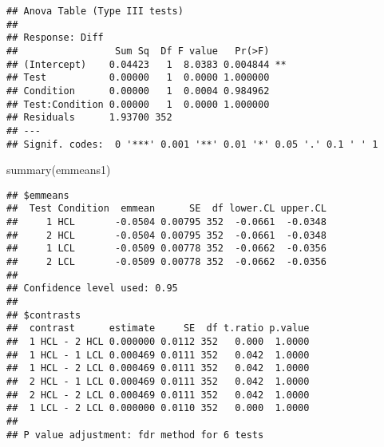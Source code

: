 \documentclass[
]{article}
\newenvironment{Shaded}{\begin{snugshade}}{\end{snugshade}}
\newcommand{\AttributeTok}[1]{\textcolor[rgb]{0.77,0.63,0.00}{#1}}
\newcommand{\CommentTok}[1]{\textcolor[rgb]{0.56,0.35,0.01}{\textit{#1}}}
\newcommand{\FunctionTok}[1]{\textcolor[rgb]{0.00,0.00,0.00}{#1}}
\newcommand{\NormalTok}[1]{#1}
\newcommand{\OtherTok}[1]{\textcolor[rgb]{0.56,0.35,0.01}{#1}}
\newcommand{\SpecialCharTok}[1]{\textcolor[rgb]{0.00,0.00,0.00}{#1}}
\newcommand{\StringTok}[1]{\textcolor[rgb]{0.31,0.60,0.02}{#1}}
\begin{document}
\begin{Shaded}
\end{Shaded}

\begin{verbatim}
## Anova Table (Type III tests)
## 
## Response: Diff
##                 Sum Sq  Df F value   Pr(>F)   
## (Intercept)    0.04423   1  8.0383 0.004844 **
## Test           0.00000   1  0.0000 1.000000   
## Condition      0.00000   1  0.0004 0.984962   
## Test:Condition 0.00000   1  0.0000 1.000000   
## Residuals      1.93700 352                    
## ---
## Signif. codes:  0 '***' 0.001 '**' 0.01 '*' 0.05 '.' 0.1 ' ' 1
\end{verbatim}

\begin{Shaded}
\begin{Highlighting}[]
\FunctionTok{summary}\NormalTok{(emmeans1)}
\end{Highlighting}
\end{Shaded}

\begin{verbatim}
## $emmeans
##  Test Condition  emmean      SE  df lower.CL upper.CL
##     1 HCL       -0.0504 0.00795 352  -0.0661  -0.0348
##     2 HCL       -0.0504 0.00795 352  -0.0661  -0.0348
##     1 LCL       -0.0509 0.00778 352  -0.0662  -0.0356
##     2 LCL       -0.0509 0.00778 352  -0.0662  -0.0356
## 
## Confidence level used: 0.95 
## 
## $contrasts
##  contrast      estimate     SE  df t.ratio p.value
##  1 HCL - 2 HCL 0.000000 0.0112 352   0.000  1.0000
##  1 HCL - 1 LCL 0.000469 0.0111 352   0.042  1.0000
##  1 HCL - 2 LCL 0.000469 0.0111 352   0.042  1.0000
##  2 HCL - 1 LCL 0.000469 0.0111 352   0.042  1.0000
##  2 HCL - 2 LCL 0.000469 0.0111 352   0.042  1.0000
##  1 LCL - 2 LCL 0.000000 0.0110 352   0.000  1.0000
## 
## P value adjustment: fdr method for 6 tests
\end{verbatim}
\end{document}
